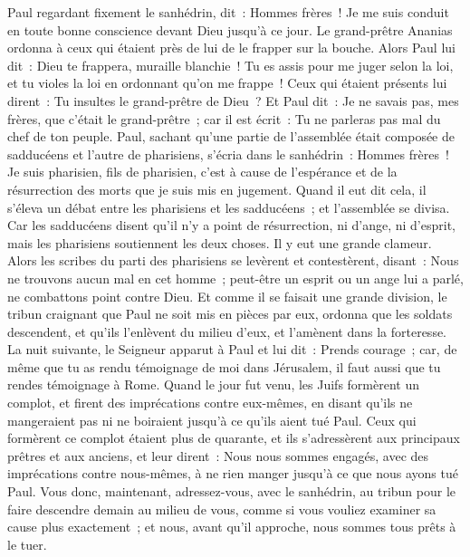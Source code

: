 \begin{multicols}{2}
\VerseOne{}Paul regardant fixement le sanhédrin, dit~: Hommes frères~! Je me suis conduit en toute bonne conscience devant Dieu jusqu'à ce jour.
Le grand-prêtre Ananias ordonna à ceux qui étaient près de lui de le frapper sur la bouche.
Alors Paul lui dit~: Dieu te frappera, muraille blanchie~! Tu es assis pour me juger selon la loi, et tu violes la loi en ordonnant qu'on me frappe~!
Ceux qui étaient présents lui dirent~: Tu insultes le grand-prêtre de Dieu~?
Et Paul dit~: Je ne savais pas, mes frères, que c'était le grand-prêtre~; car il est écrit~: Tu ne parleras pas mal du chef de ton peuple.
Paul, sachant qu'une partie de l'assemblée était composée de sadducéens et l'autre de pharisiens, s'écria dans le sanhédrin~: Hommes frères~! Je suis pharisien, fils de pharisien, c'est à cause de l'espérance et de la résurrection des morts que je suis mis en jugement.
Quand il eut dit cela, il s'éleva un débat entre les pharisiens et les sadducéens~; et l'assemblée se divisa.
Car les sadducéens disent qu'il n'y a point de résurrection, ni d'ange, ni d'esprit, mais les pharisiens soutiennent les deux choses.
Il y eut une grande clameur. Alors les scribes du parti des pharisiens se levèrent et contestèrent, disant~: Nous ne trouvons aucun mal en cet homme~; peut-être un esprit ou un ange lui a parlé, ne combattons point contre Dieu.
Et comme il se faisait une grande division, le tribun craignant que Paul ne soit mis en pièces par eux, ordonna que les soldats descendent, et qu'ils l'enlèvent du milieu d'eux, et l'amènent dans la forteresse.
La nuit suivante, le Seigneur apparut à Paul et lui dit~: Prends courage~; car, de même que tu as rendu témoignage de moi dans Jérusalem, il faut aussi que tu rendes témoignage à Rome.
Quand le jour fut venu, les Juifs formèrent un complot, et firent des imprécations contre eux-mêmes, en disant qu'ils ne mangeraient pas ni ne boiraient jusqu'à ce qu'ils aient tué Paul.
Ceux qui formèrent ce complot étaient plus de quarante,
et ils s'adressèrent aux principaux prêtres et aux anciens, et leur dirent~: Nous nous sommes engagés, avec des imprécations contre nous-mêmes, à ne rien manger jusqu'à ce que nous ayons tué Paul.
Vous donc, maintenant, adressez-vous, avec le sanhédrin, au tribun pour le faire descendre demain au milieu de vous, comme si vous vouliez examiner sa cause plus exactement~; et nous, avant qu'il approche, nous sommes tous prêts à le tuer.

\end{multicols}
